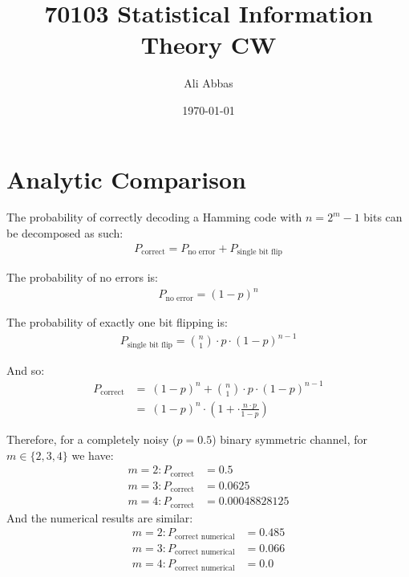 \documentclass[fleqn]{article}
\date{\today}
\author{Ali Abbas}
\title{70103 Statistical Information Theory CW}
\begin{document}
  \maketitle
  \section{Analytic Comparison}
  The probability of correctly decoding a Hamming code with $n = 2^m - 1$ bits can be decomposed as such:
  \begin{align*}
    P_{\text{correct}} = P_{\text{no error}} + P_{\text{single bit flip}}
  \end{align*}
  
  The probability of no errors is:
  \begin{align*}
    P_{\text{no error}} = (1 - p)^n
  \end{align*}
  
  The probability of exactly one bit flipping is:
  \begin{align*}
    P_{\text{single bit flip}} = \binom{n}{1} \cdot p \cdot (1 - p)^{n-1}
  \end{align*}
  
  And so:
  \begin{align*}
    P_{\text{correct}} &=\ (1 - p)^n + \binom{n}{1} \cdot p \cdot (1 - p)^{n-1} \\
     &=\ (1 - p)^n \cdot \left(1 + \cdot \frac{n \cdot p}{1 - p}\right)
  \end{align*}

  Therefore, for a completely noisy ($p = 0.5$) binary symmetric channel, for $m \in \{2, 3, 4 \}$ we have:
  \begin{align*}
    m = 2: P_{\text{correct}} &= 0.5 \\
    m = 3: P_{\text{correct}} &= 0.0625 \\
    m = 4: P_{\text{correct}} &= 0.00048828125
  \end{align*}
  And the numerical results are similar:
  \begin{align*}
    m = 2: P_{\text{correct numerical}} &= 0.485 \\
    m = 3: P_{\text{correct numerical}} &= 0.066 \\
    m = 4: P_{\text{correct numerical}} &= 0.0
  \end{align*}
\end{document}
